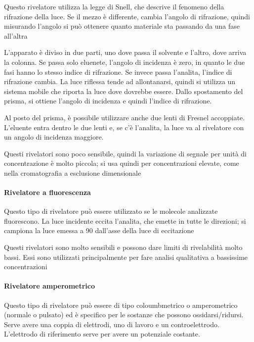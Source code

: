 
Questo rivelatore utilizza la legge di Snell, che descrive il fenomeno della rifrazione della luce. Se il mezzo è differente, cambia l'angolo di rifrazione, quindi
misurando l'angolo si può ottenere quanto materiale sta passando da una fase all'altra


L'apparato è diviso in due parti, uno dove passa il solvente e l'altro, dove arriva la colonna.
Se passa solo eluenete, l'angolo di incidenza è zero, in quanto le due fasi hanno lo stesso indice di rifrazione. Se invece passa l'analita, l'indice di rifrazione cambia.
La luce riflessa tende ad allontanarsi, quindi si utilizza un sistema mobile che riporta la luce dove dovrebbe essere. Dallo spostamento del prisma, si ottiene l'angolo di incidenza e quindi l'indice di rifrazione.

Al posto del prisma, è possibile utilizzare anche due lenti di Fresnel accoppiate. L'eluente entra dentro le due lenti e, se c'è l'analita, la luce va al rivelatore con un angolo di incidenza maggiore.


Questi rivelatori sono poco sensibile, quindi la variazione di segnale per unità di concentrazione è molto piccola; si usa quindi per concentrazioni elevate, come nella cromatografia a esclusione dimensionale

\paragraph{Rivelatore a fluorescenza}
Questo tipo di rivelatore può essere utilizzato se le molecole analizzate fluorescono.
La luce incidente eccita l'analita, che emette in tutte le direzioni; si campiona la luce emessa a 90 \degree dall'asse della luce di eccitazione


Questi rivelatori sono molto sensibili e possono dare limiti di rivelabilità molto bassi. Essi sono utilizzati principalmente per fare analisi qualitativa a bassissime concentrazioni

\paragraph{Rivelatore amperometrico}
Questo tipo di rivelatore può essere di tipo coloumbmetrico o amperometrico (normale o pulsato) ed è specifico per le sostanze che possono ossidarsi/ridursi.
Serve avere una coppia di elettrodi, uno di lavoro e un controelettrodo. L'elettrodo di riferimento serve per avere un potenziale costante.

